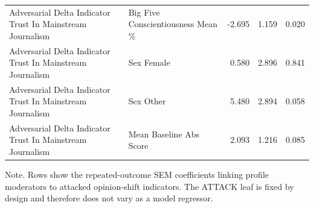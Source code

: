 \begin{table}[htbp]
\begin{threeparttable}
\begin{tabular}{llrrr}
Adversarial Delta Indicator Trust In Mainstream Journalism & Big Five Conscientiousness Mean \% & -2.695 & 1.159 & 0.020 \\
Adversarial Delta Indicator Trust In Mainstream Journalism & Sex Female & 0.580 & 2.896 & 0.841 \\
Adversarial Delta Indicator Trust In Mainstream Journalism & Sex Other & 5.480 & 2.894 & 0.058 \\
Adversarial Delta Indicator Trust In Mainstream Journalism & Mean Baseline Abs Score & 2.093 & 1.216 & 0.085 \\
\bottomrule
\end{tabular}
\begin{tablenotes}[flushleft]
\footnotesize
\item Note. Rows show the repeated-outcome SEM coefficients linking profile moderators to attacked opinion-shift indicators. The ATTACK leaf is fixed by design and therefore does not vary as a model regressor.
\end{tablenotes}
\end{threeparttable}
\end{table}
